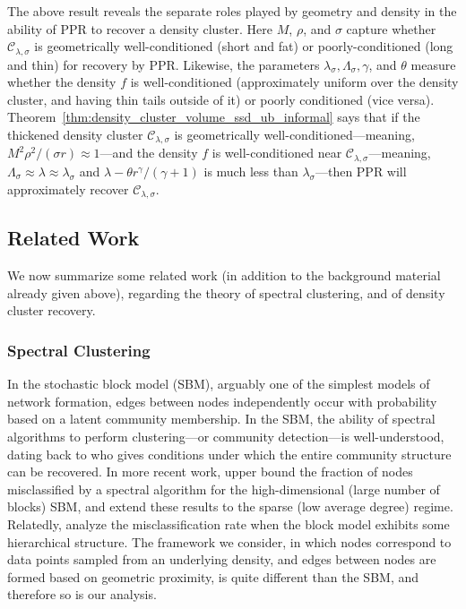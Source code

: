 \documentclass[twoside,11pt]{article}
\newcommand{\1}{\mathbf{1}}
\newcommand{\mc}[1]{\mathcal{#1}}
\begin{document}
The above result reveals the separate roles played by geometry and density in the ability of PPR to recover a density cluster. Here $M$, $\rho$, and $\sigma$ capture whether $\mc{C}_{\lambda,\sigma}$ is geometrically well-conditioned (short and fat) or poorly-conditioned (long and thin) for recovery by PPR. Likewise, the parameters $\lambda_{\sigma}, \Lambda_{\sigma}, \gamma$, and $\theta$ measure whether the density $f$ is well-conditioned (approximately uniform over the density cluster, and having thin tails outside of it) or poorly conditioned (vice versa). Theorem~\ref{thm:density_cluster_volume_ssd_ub_informal} says that if the thickened density cluster $\mc{C}_{\lambda,\sigma}$ is geometrically well-conditioned---meaning, $M^2\rho^2/(\sigma r) \approx 1$---and the density $f$ is well-conditioned near $\mc{C}_{\lambda,\sigma}$---meaning, $\Lambda_{\sigma} \approx \lambda \approx \lambda_{\sigma}$ and $\lambda - \theta r^{\gamma}/(\gamma + 1)$ is much less than $\lambda_{\sigma}$---then PPR will approximately recover $\mc{C}_{\lambda,\sigma}$.

\subsection{Related Work}
\label{subsec:related_work}
We now summarize some related work (in addition to the background material already given above), regarding the theory of spectral clustering, and of density cluster recovery.

\subsubsection{Spectral Clustering} 
In the stochastic block model (SBM), arguably one of the simplest models of network formation, edges between nodes independently occur with probability based on a latent community membership. In the SBM, the ability of spectral algorithms to perform clustering---or community detection---is well-understood, dating back to \citet{mcsherry2001} who gives conditions under which the entire community structure can be recovered. In more recent work, \citet{rohe2011} upper bound the fraction of nodes misclassified by a spectral algorithm for the high-dimensional (large number of blocks) SBM, and \citet{lei2015} extend these results to the sparse (low average degree) regime. Relatedly, \citet{clauset08,balakrishnan2011,li2018} analyze the misclassification rate when the block model exhibits some hierarchical structure. The framework we consider, in which nodes correspond to data points sampled from an underlying density, and edges between nodes are formed based on geometric proximity, is quite different than the SBM, and therefore so is our analysis.
\end{document}
